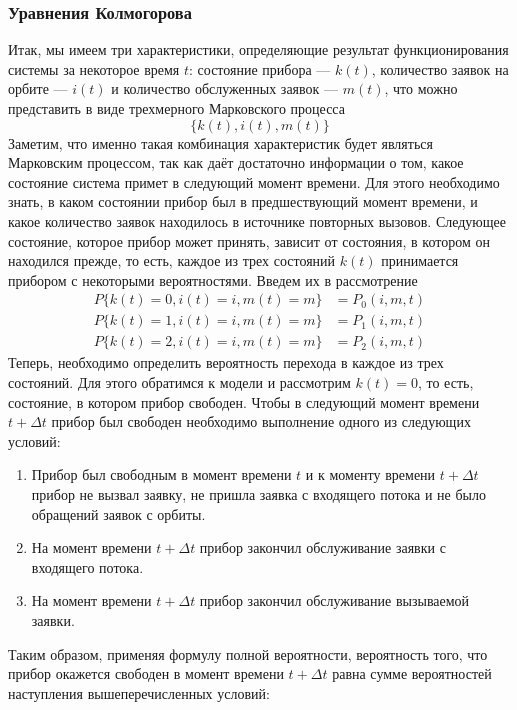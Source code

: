 \subsubsection{Уравнения Колмогорова}
Итак, мы имеем три характеристики, определяющие результат функционирования системы за некоторое время $t$: состояние прибора --- $k(t)$, количество заявок на орбите --- $i(t)$ и количество обслуженных заявок --- $m(t)$, что можно представить в виде трехмерного Марковского процесса
\begin{equation*}
	\{k(t),i(t),m(t)\}
\end{equation*}
Заметим, что именно такая комбинация характеристик будет являться Марковским процессом, так как даёт достаточно информации о том, какое состояние система примет в следующий момент времени. Для этого необходимо знать, в каком состоянии прибор был в предшествующий момент времени, и какое количество заявок находилось в источнике повторных вызовов.
Следующее состояние, которое прибор может принять, зависит от состояния, в котором он находился прежде, то есть, каждое из трех состояний $k(t)$ принимается прибором с некоторыми вероятностями. Введем их в рассмотрение
\begin{equation*}
	\begin{split}
		P\{k(t)=0,i(t)=i,m(t)=m\} &=P_{0}(i,m,t)\\
		P\{k(t)=1,i(t)=i,m(t)=m\} &=P_{1}(i,m,t)\\
		P\{k(t)=2,i(t)=i,m(t)=m\} &=P_{2}(i,m,t)
	\end{split}
\end{equation*}
Теперь, необходимо определить вероятность перехода в каждое из трех состояний. Для этого обратимся к модели и рассмотрим $k(t) = 0$, то есть, состояние, в котором прибор свободен. Чтобы в следующий момент времени $t+\Delta t$ прибор был свободен необходимо выполнение одного из следующих условий:
\begin{enumerate}
	\item Прибор был свободным в момент времени $t$ и к моменту времени $t+\Delta t$  прибор не вызвал заявку, не пришла заявка с входящего потока и не было обращений заявок с орбиты.
	\item На момент времени $t+\Delta t$ прибор закончил обслуживание заявки с входящего потока.
	\item На момент времени $t+\Delta t$ прибор закончил обслуживание вызываемой заявки.
\end{enumerate}
Таким образом, применяя формулу полной вероятности, вероятность того, что прибор окажется свободен в момент времени $t+\Delta t$ равна сумме вероятностей наступления вышеперечисленных условий:
